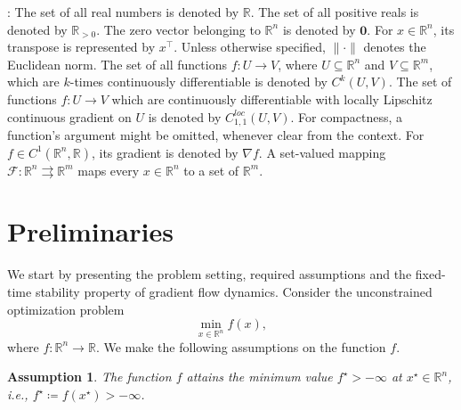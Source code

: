 \documentclass[letterpaper]{article}
\newtheorem{assumption}{Assumption}
\begin{document}

: The set of all real numbers is denoted by $\mathbb{R}$. The set of all positive reals is denoted by $\mathbb{R}_{>0}$. The zero vector belonging to $\mathbb{R}^n$ is denoted by $\bm{0}$. For $x\in \mathbb{R}^n$, its transpose is represented by $x^\intercal$. Unless otherwise specified, $\|\cdot\|$ denotes the Euclidean norm. The set of all functions $f\!:\!U\!\to\!V$, where $U\subseteq \mathbb{R}^n$ and $V\subseteq \mathbb{R}^m$, which are $k$-times continuously differentiable is denoted by $C^k(U,V)$. The set of functions $f\!:\!U\!\rightarrow \!V$ which are continuously differentiable with locally Lipschitz continuous gradient on $U$ is denoted by $C^{loc}_{1,1}(U,V)$. For compactness, a function's argument might be omitted, whenever clear from the context. For $f\in C^1(\mathbb{R}^n, \mathbb{R})$, its gradient is denoted by $\nabla f$. A set-valued mapping $\mathcal{F}:\mathbb{R}^n \rightrightarrows \mathbb{R}^m$ maps every $x\in \mathbb{R}^n$ to a set of $\mathbb{R}^m$.


\section{Preliminaries} \label{sec: prelims}
We start by presenting the problem setting, required assumptions and the fixed-time stability property of gradient flow dynamics. Consider the unconstrained optimization problem
\begin{equation} \label{opt_prob}
\min_{x\in \mathbb{R}^n} f(x),
\end{equation}
where $f:\mathbb{R}^n \to \mathbb{R}$. We make the following assumptions on the function $f$.

\begin{assumption} \label{basicasmp}
The function $f$ attains the minimum value $f^\star>-\infty$ at $x^\star \in \mathbb{R}^n$, i.e., $f^\star \coloneqq f(x^\star)>-\infty$.
\end{assumption}
\end{document}
